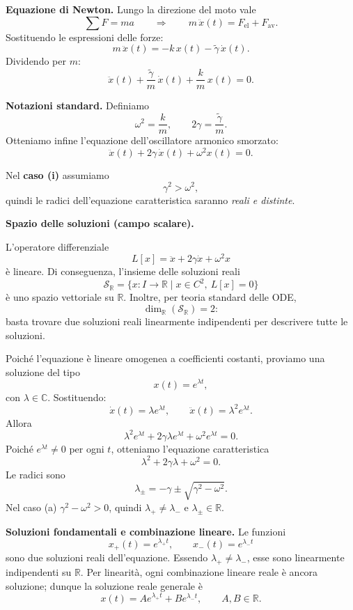 \textbf{Equazione di Newton.}
Lungo la direzione del moto vale
\[
\sum F = m a \qquad \Longrightarrow \qquad m\,\ddot x(t)=F_{\mathrm{el}}+F_{\mathrm{av}}.
\]
Sostituendo le espressioni delle forze:
\[
m\,\ddot x(t)=-k\,x(t)-\tilde{\gamma}\,\dot x(t).
\]
Dividendo per \(m\):
\[
\ddot x(t)+\frac{\tilde{\gamma}}{m}\,\dot x(t)+\frac{k}{m}\,x(t)=0.
\]

\textbf{Notazioni standard.}
Definiamo
\[
\omega^2=\frac{k}{m},
\qquad
2\gamma=\frac{\tilde{\gamma}}{m}.
\]
Otteniamo infine l’equazione dell’oscillatore armonico smorzato:
\[
\ddot x(t)+2\gamma\,\dot x(t)+\omega^2 x(t)=0.
\]


Nel \textbf{caso (i)} assumiamo
\[
\gamma^2>\omega^2,
\]
quindi le radici dell'equazione caratteristica saranno \emph{reali e distinte}.
\medskip

\inizioapprof

\textbf{Spazio delle soluzioni (campo scalare).}

L'operatore differenziale
\[
L[x]=\ddot x+2\gamma \dot x+\omega^2 x
\]
è lineare. Di conseguenza, l'insieme delle soluzioni reali
\[
\mathcal S_{\mathbb R}
=
\{x:I\to\mathbb R \mid x\in C^2,\ L[x]=0\}
\]
è uno spazio vettoriale su \(\mathbb R\). Inoltre, per teoria standard delle ODE,
\[
\dim_{\mathbb R}(\mathcal S_{\mathbb R})=2:
\]
basta trovare due soluzioni reali linearmente indipendenti per descrivere tutte le soluzioni.

\fineapprof

\medskip

Poiché l'equazione è lineare omogenea a coefficienti costanti, proviamo una soluzione del tipo
\[
x(t)=e^{\lambda t},
\]
con \(\lambda\in\mathbb{C}\). Sostituendo:
\[
\dot x(t)=\lambda e^{\lambda t},
\qquad
\ddot x(t)=\lambda^2 e^{\lambda t}.
\]
Allora
\[
\lambda^2 e^{\lambda t}+2\gamma \lambda e^{\lambda t}+\omega^2 e^{\lambda t}=0.
\]
Poiché \(e^{\lambda t}\neq 0\) per ogni \(t\), otteniamo l'equazione caratteristica
\[
\lambda^2+2\gamma\lambda+\omega^2=0.
\]
Le radici sono
\[
\lambda_{\pm}=-\gamma\pm\sqrt{\gamma^2-\omega^2}.
\]
Nel caso (a) \(\gamma^2-\omega^2>0\), quindi \(\lambda_+\neq \lambda_-\) e \(\lambda_\pm\in\mathbb{R}\).

\medskip
\textbf{Soluzioni fondamentali e combinazione lineare.}
Le funzioni
\[
x_+(t)=e^{\lambda_+ t},
\qquad
x_-(t)=e^{\lambda_- t}
\]
sono due soluzioni reali dell'equazione. Essendo \(\lambda_+\neq\lambda_-\), esse sono linearmente indipendenti su \(\mathbb{R}\).
Per linearità, ogni combinazione lineare reale è ancora soluzione; dunque la soluzione reale generale è
\[
x(t)=A e^{\lambda_+ t}+B e^{\lambda_- t},
\qquad A,B\in\mathbb{R}.
\]

